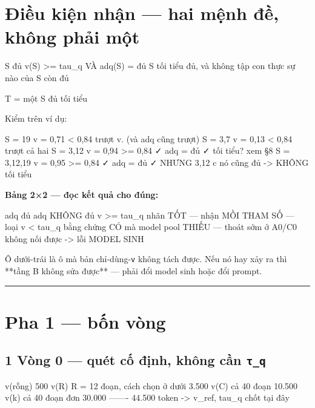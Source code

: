 \documentclass[11pt,a4paper]{article}
\begin{document}
\section{Điều kiện nhận — hai mệnh đề, không phải một}

\begin{dia}
S đủ         v(S) >= tau_q          VÀ     adq(S) = đủ
S tối tiểu   đủ, và không tập con thực sự nào của S còn đủ

T   =   một S đủ tối tiểu
\end{dia}

Kiểm trên ví dụ:

\begin{dia}
S = {19}       v = 0,71 < 0,84        trượt v.   (và adq cũng trượt)
S = {3,7}      v = 0,13 < 0,84        trượt cả hai
S = {3,12}     v = 0,94 >= 0,84   ✓    adq = đủ  ✓    tối tiểu?  xem §8
S = {3,12,19}  v = 0,95 >= 0,84   ✓    adq = đủ  ✓    NHƯNG {3,12} c nó cũng đủ
                                                      ->  KHÔNG tối tiểu
\end{dia}

\textbf{Bảng 2×2 — đọc kết quả cho đúng:}

\begin{dia}
                     adq đủ                       adq KHÔNG đủ
v >= tau_q        nhãn TỐT — nhận               MỒI THAM SỐ — loại
v <  tau_q       bằng chứng CÓ mà model        pool THIẾU — thoát sớm ở A0/C0
               không nối được
               -> lỗi MODEL SINH
\end{dia}

Ô dưới-trái là ô mà bản chỉ-dùng-\texttt{v} không tách được. Nếu nó hay xảy ra thì **tầng B không
sửa được** — phải đổi model sinh hoặc đổi prompt.

\vspace{0.3em}\hrule\vspace{0.6em}

\section{Pha 1 — bốn vòng}

\subsection{1 Vòng 0 — quét cố định, không cần \texttt{τ\_q}}

\begin{dia}
v(rỗng)                                      500
v(R)     R = 12 đoạn, cách chọn ở dưới  3.500
v(C)     cả 40 đoạn                    10.500
v({k})   cả 40 đoạn đơn                30.000
                                      -------
                                       44.500 token
->  v_ref,  tau_q  chốt tại đây
\end{dia}
\end{document}
